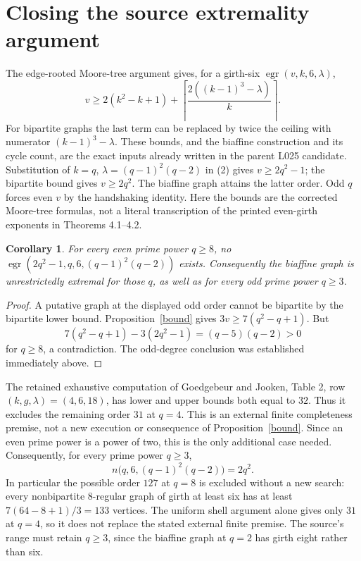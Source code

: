 \documentclass[11pt,a4paper]{article}
\newtheorem{corollary}[lemma]{Corollary}
\begin{document}
\section{Closing the source extremality argument}
The edge-rooted Moore-tree argument gives, for a girth-six
$\operatorname{egr}(v,k,6,\lambda)$,
\[
 v\geq2(k^2-k+1)+
 \left\lceil\frac{2((k-1)^3-\lambda)}k\right\rceil .       \tag{2}
\]
For bipartite graphs the last term can be replaced by twice the
ceiling with numerator $(k-1)^3-\lambda$. These bounds, and the
biaffine construction and its cycle count, are the exact inputs
already written in the parent L025 candidate. Substitution of
$k=q$, $\lambda=(q-1)^2(q-2)$ in (2) gives $v\geq2q^2-1$;
the bipartite bound gives $v\geq2q^2$. The biaffine graph attains the
latter order. Odd $q$ forces even $v$ by the handshaking identity.
Here the bounds are the corrected Moore-tree formulas, not a literal
transcription of the printed even-girth exponents in Theorems 4.1--4.2.

\begin{corollary}
For every even prime power $q\geq8$, no
$\operatorname{egr}(2q^2-1,q,6,(q-1)^2(q-2))$ exists.
Consequently the biaffine graph is unrestrictedly extremal for
those $q$, as well as for every odd prime power $q\geq3$.
\end{corollary}
\begin{proof}
A putative graph at the displayed odd order cannot be bipartite by
the bipartite lower bound. Proposition~\ref{bound} gives
$3v\geq7(q^2-q+1)$. But
\[
 7(q^2-q+1)-3(2q^2-1)=(q-5)(q-2)>0
\]
for $q\geq8$, a contradiction. The odd-degree conclusion was
established immediately above.
\end{proof}

The retained exhaustive computation of Goedgebeur and Jooken,
Table 2, row $(k,g,\lambda)=(4,6,18)$, has lower and upper bounds
both equal to $32$. Thus it excludes the remaining order $31$ at
$q=4$. This is an external finite completeness premise, not a new
execution or consequence of Proposition~\ref{bound}.
Since an even prime power is a power of two, this is the only additional
case needed. Consequently, for every prime power $q\geq3$,
\[
 n\bigl(q,6,(q-1)^2(q-2)\bigr)=2q^2.
\]
In particular the possible order $127$ at $q=8$ is excluded without a
new search: every nonbipartite $8$-regular graph of girth at least six
has at least $7(64-8+1)/3=133$ vertices. The uniform shell argument
alone gives only $31$ at $q=4$, so it does not replace the stated
external finite premise. The source's range must retain $q\geq3$,
since the biaffine graph at $q=2$ has girth eight rather than six.
\end{document}
